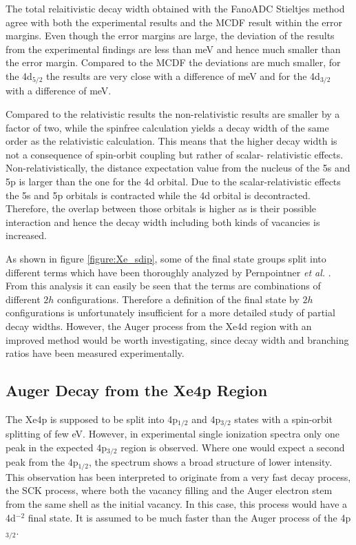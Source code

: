 The total relaitivistic decay width obtained with the FanoADC
Stieltjes method agree with
both the experimental results and the \ac{MCDF} result within the error margins.
Even though the error margins are large, the deviation of the results
from the experimental findings are
less than \unit[52]{meV} and hence much smaller than the error margin. 
Compared to the \ac{MCDF} the deviations are much smaller, for the 4d$_{5/2}$
the results are very close with a difference of \unit[2]{meV} and for the
4d$_{3/2}$ with a difference of \unit[10]{meV}.

Compared to the relativistic results the non-relativistic results are smaller
by a factor of two, while the spinfree calculation yields a decay width
of the same order as the relativistic calculation. This means that the higher
decay width is not a consequence of spin-orbit coupling but rather of scalar-
relativistic effects. Non-relativistically, the distance expectation value
from the nucleus of the 5s and 5p is larger than the one for the 4d orbital. Due to
the scalar-relativistic effects the 5s and 5p orbitals is contracted while the 4d
orbital is decontracted. Therefore, the overlap between those orbitals is higher
as is their possible interaction and hence the decay width including both
kinds of vacancies is increased.

As shown in figure \ref{figure:Xe_sdip}, some of the final state groups
split into different terms which have been thoroughly analyzed by
Pernpointner \textit{et al.} \cite{Pernpointner12_2}. From this analysis
it can easily be seen that the terms are combinations of different $2h$
configurations. Therefore a definition of the final state by $2h$
configurations is unfortunately insufficient for a more detailed
study of partial decay widths.
However, the Auger process from the Xe4d region with an improved method
would be worth investigating, since decay width and branching ratios have been
measured experimentally. \cite{Aksela94}




\subsection{Auger Decay from the Xe4p Region}
The Xe4p is supposed to be split into 4p$_{1/2}$ and 4p$_{3/2}$ states with
a spin-orbit splitting of few \unit{eV}. However, in experimental single
ionization spectra only one peak in the expected 4p$_{3/2}$ region is observed.
Where one would expect a second peak from the 4p$_{1/2}$, the spectrum shows
a broad structure of lower intensity. This observation has been interpreted
to originate from a very fast decay process, the \ac{SCK} process, where both the
vacancy filling and the Auger electron stem from the same shell as the initial
vacancy. In this case, this process would have a 4d$^{-2}$ final state.
It is assumed to be much faster than the Auger process
of the 4p$_{3/2}$. 

